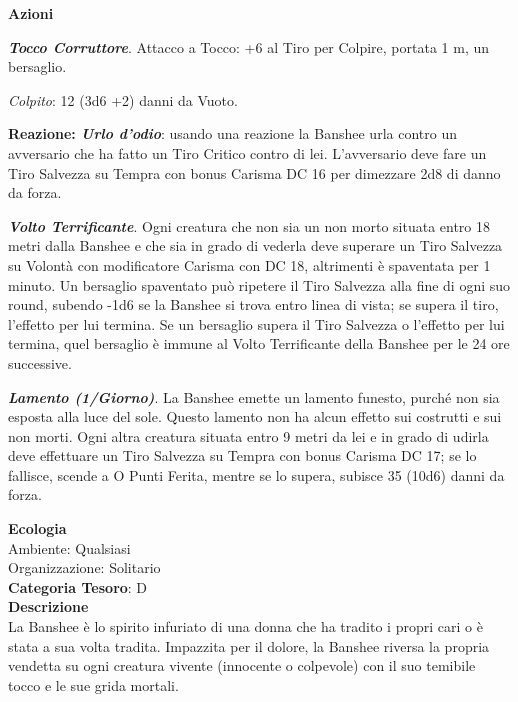 \begin{multicols}{2}
{\textbf{Azioni}

\emph{\textbf{Tocco Corruttore}}. Attacco a Tocco: +6 al Tiro per Colpire, portata 1 m, un bersaglio.

\emph{Colpito}: 12 (3d6 +2) danni da Vuoto.

\textbf{Reazione: \emph{Urlo d'odio}}: usando una reazione la Banshee urla contro un avversario che ha fatto un Tiro Critico contro di lei. L'avversario deve fare un Tiro Salvezza su Tempra con bonus Carisma DC 16 per dimezzare 2d8 di danno da forza.

\emph{\textbf{Volto Terrificante}}. Ogni creatura che non sia un non morto situata entro 18 metri dalla Banshee e che sia in grado di vederla deve superare un Tiro Salvezza su Volontà con modificatore Carisma con DC 18, altrimenti è spaventata per 1 minuto. Un bersaglio spaventato può ripetere il Tiro Salvezza alla fine di ogni suo round, subendo -1d6 se la Banshee si trova entro linea di vista; se supera il tiro, l'effetto per lui termina. Se un bersaglio supera il Tiro Salvezza o l'effetto per lui termina, quel bersaglio è immune al Volto Terrificante della Banshee per le 24 ore successive.

\emph{\textbf{Lamento (1/Giorno)}}. La Banshee emette un lamento funesto, purché non sia esposta alla luce del sole. Questo lamento non ha alcun effetto sui costrutti e sui non morti. Ogni altra creatura situata entro 9 metri da lei e in grado di udirla deve effettuare un Tiro Salvezza su Tempra con bonus Carisma DC 17; se lo fallisce, scende a O Punti Ferita, mentre se lo supera, subisce 35 (10d6) danni da forza.

\textbf{Ecologia}\\
Ambiente: Qualsiasi\\
Organizzazione: Solitario\\
\textbf{Categoria Tesoro}: D\\
\textbf{Descrizione}\\
La Banshee è lo spirito infuriato di una donna che ha tradito i propri cari o è stata a sua volta tradita. Impazzita per il dolore, la Banshee riversa la propria vendetta su ogni creatura vivente (innocente o colpevole) con il suo temibile tocco e le sue grida mortali.

}
\end{multicols}
